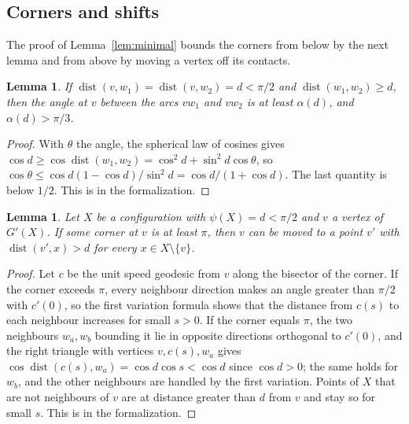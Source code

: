 \documentclass[12pt]{amsart}
\newtheorem{lemma}[theorem]{Lemma}
\theoremstyle{definition}
\theoremstyle{plain}
\theoremstyle{definition}
\newcommand{\dist}{\operatorname{dist}}
\newcommand{\leanmap}[1]{\ignorespaces}
\newcommand{\mapnote}[1]{\ignorespaces}
\begin{document}
\subsection{Corners and shifts}
The proof of Lemma~\ref{lem:minimal} bounds the corners from below by the next lemma and from above by moving a vertex off its contacts.

\begin{lemma}\label{lem:alpha}\leanmap{Tammes15.alpha_le_angle, Tammes15.alpha_bounds}
If $\dist(v,w_1)=\dist(v,w_2)=d<\pi/2$ and $\dist(w_1,w_2)\ge d$, then the angle at $v$ between the arcs $vw_1$ and $vw_2$ is at least $\alpha(d)$, and $\alpha(d)>\pi/3$.
\end{lemma}

\begin{proof}
With $\theta$ the angle, the spherical law of cosines gives $\cos d\ge\cos\dist(w_1,w_2)=\cos^2d+\sin^2d\cos\theta$, so $\cos\theta\le\cos d(1-\cos d)/\sin^2d=\cos d/(1+\cos d)$. The last quantity is below $1/2$. This is  in the formalization.
\end{proof}

\begin{lemma}\label{lem:shift}\leanmap{Tammes15.exists_push_dir, Tammes15.shift_config, Tammes15.shift_move}\mapnote{without the closeness of $v'$ to $v$, which Lemma \ref{lem:minimal} does not use}
Let $X$ be a configuration with $\psi(X)=d<\pi/2$ and $v$ a vertex of $G'(X)$. If some corner at $v$ is at least $\pi$, then $v$ can be moved to a point $v'$ with $\dist(v',x)>d$ for every $x\in X\setminus\{v\}$.
\end{lemma}

\begin{proof}
Let $c$ be the unit speed geodesic from $v$ along the bisector of the corner. If the corner exceeds $\pi$, every neighbour direction makes an angle greater than $\pi/2$ with $c'(0)$, so the first variation formula shows that the distance from $c(s)$ to each neighbour increases for small $s>0$. If the corner equals $\pi$, the two neighbours $w_a,w_b$ bounding it lie in opposite directions orthogonal to $c'(0)$, and the right triangle with vertices $v,c(s),w_a$ gives $\cos\dist(c(s),w_a)=\cos d\cos s<\cos d$ since $\cos d>0$; the same holds for $w_b$, and the other neighbours are handled by the first variation. Points of $X$ that are not neighbours of $v$ are at distance greater than $d$ from $v$ and stay so for small $s$. This is  in the formalization.
\end{proof}
\end{document}
